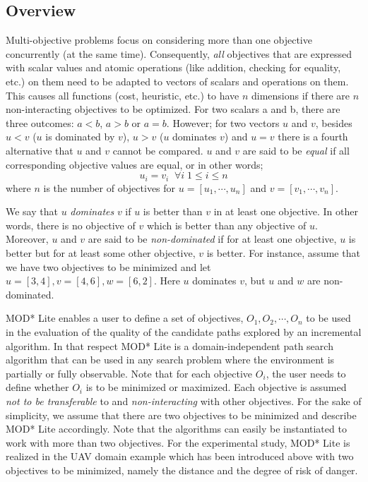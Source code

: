 \documentclass[10pt,journal]{IEEEtran}
\begin{document}
\subsection{Overview}
Multi-objective problems focus on considering more than one objective concurrently (at the same time). Consequently, \textit{all} objectives that are expressed with scalar values and atomic operations (like addition, checking for equality, etc.) on them need to be adapted to vectors of scalars and operations on them. This causes all functions (cost, heuristic, etc.) to have $n$ dimensions if there are $n$ non-interacting objectives to be optimized. For two scalars a and b, there are three outcomes: $a<b$, $a>b$ or $a=b$. However; for two vectors $u$ and $v$, besides $u<v$ ($u$ is dominated by $v$), $u>v$ ($u$ dominates $v$) and $u=v$ there is a fourth alternative that $u$ and $v$ cannot be compared. $u$ and $v$ are said to be \textit{equal} if all corresponding objective values are equal, or in other words;
\[ u_{i} = v_{i} \;\; \forall i \; 1 \leq i \leq n	  \] where $n$ is the number of objectives for $u=[u_1, \cdots, u_n]$ and $v=[v_1,\cdots,v_n]$. 

We say that $u$ \textit{dominates} $v$ if $u$ is better than $v$ in at least one objective. In other words, there is no objective of $v$ which is better than any objective of $u$. Moreover, $u$ and $v$ are said to be \textit{non-dominated} if for at least one objective,  $u$ is better but for at least some other objective, $v$ is better. For instance, assume that we have two objectives to be minimized and let $u=[3,4], v=[4,6], w=[6,2] $. Here $u$ dominates $v$, but $u$ and $w$ are non-dominated.

MOD* Lite enables a user to define a set of objectives, $O_1, O_2, \cdots, O_n$ to be used in the evaluation of the quality of the candidate paths explored by an incremental algorithm. In that respect MOD* Lite is a domain-independent path search algorithm that can be used in any search problem where the environment is partially or fully observable. Note that for each objective $O_i$, the user needs to define whether $O_i$ is to be minimized or maximized. Each objective is assumed \textit{not to be transferable} to and \textit{non-interacting} with other objectives.  For the sake of simplicity, we assume that there are two objectives to be minimized and describe MOD* Lite accordingly. Note that the algorithms can easily be instantiated to work with more than two objectives. For the experimental study, MOD* Lite is realized in the UAV domain example which has been introduced above with two objectives to be minimized, namely the distance and the degree of risk of danger.
\end{document}
